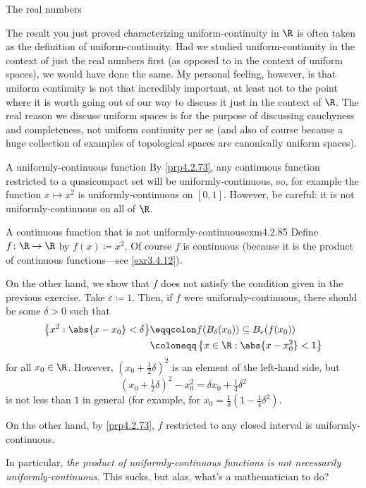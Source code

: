 \begin{exm}{The real numbers}{}
\begin{exr}[breakable=false]{}{}
\begin{rmk}
\end{rmk}
\begin{rmk}
The result you just proved characterizing uniform-continuity in $\R$ is often taken as the definition of uniform-continuity.  Had we studied uniform-continuity in the context of just the real numbers first (as opposed to in the context of uniform spaces), we would have done the same.  My personal feeling, however, is that uniform continuity is not that incredibly important, at least not to the point where it is worth going out of our way to discuss it just in the context of $\R$.  The real reason we discuss uniform spaces is for the purpose of discussing cauchyness and completeness, not uniform continuity per se (and also of course because a huge collection of examples of topological spaces are canonically uniform spaces).
\end{rmk}
\end{exr}
\end{exm}
\begin{exm}{A uniformly-continuous function}{}
By \cref{prp4.2.73}, any continuous function restricted to a quasicompact set will be uniformly-continuous, so, for example the function $x\mapsto x^2$ is uniformly-continuous on $[0,1]$.  However, be careful:  it is not uniformly-continuous on all of $\R$.
\end{exm}
\begin{exm}{A continuous function that is not uniformly-continuous}{exm4.2.85}
Define $f\colon \R \rightarrow \R$ by $f(x)\coloneqq x^2$.  Of course $f$ is continuous (because it is the product of continuous functions---see \cref{exr3.4.12}).

On the other hand, we show that $f$ does not satisfy the condition given in the previous exercise.  Take $\varepsilon \coloneqq 1$.  Then, if $f$ were uniformly-continuous, there should be some $\delta >0$ such that
\begin{equation}
\begin{split}
\left\{ x^2:\abs{x-x_0}<\delta \right\} & \eqqcolon f(B_\delta (x_0))\subseteq B_{\varepsilon}(f(x_0))\\
& \coloneqq \left\{ x\in \R :\abs{x-x_0^2}<1\right\}
\end{split} 
\end{equation}
for all $x_0\in \R$.  However, $(x_0+\frac{1}{2}\delta )^2$ is an element of the left-hand side, but
\begin{equation}
\left( x_0+\tfrac{1}{2}\delta \right) ^2-x_0^2=\delta x_0+\tfrac{1}{4}\delta ^2
\end{equation}
is not less than $1$ in general (for example, for $x_0=\frac{1}{\delta}(1-\tfrac{1}{4}\delta ^2)$.

On the other hand, by \cref{prp4.2.73}, $f$ restricted to any closed interval is uniformly-continuous.
\begin{rmk}
In particular, \emph{the product of uniformly-continuous functions is not necessarily uniformly-continuous}.  This sucks, but alas, what's a mathematician to do?
\end{rmk}
\end{exm}

